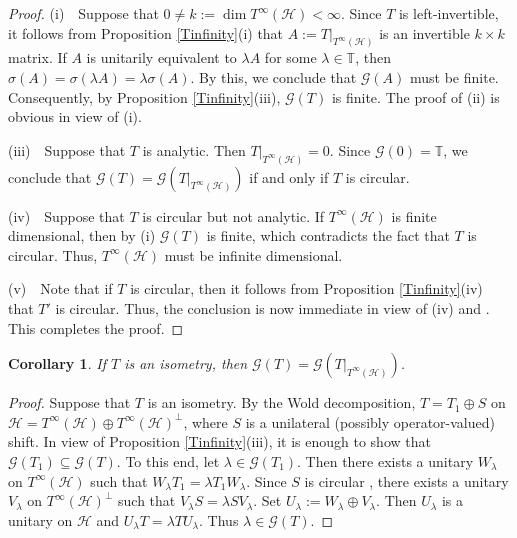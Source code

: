 \documentclass[10pt,a4paper]{amsart}
\newtheorem{corollary}[theorem]{Corollary}%
\begin{document}
\begin{proof}
(i)\ \ Suppose that $0 \ne k := \dim T^\infty(\mathcal H) < \infty$. Since $T$ is left-invertible, it follows from Proposition \ref{Tinfinity}(i) that $A := T|_{T^\infty(\mathcal H)}$ is an invertible $k \times k$ matrix. If $A$ is unitarily equivalent to $\lambda A$ for some $\lambda \in \mathbb T$, then $\sigma(A) = \sigma(\lambda A) = \lambda \sigma(A)$. By this, we conclude that $\mathcal G(A)$ must be finite. Consequently, by Proposition \ref{Tinfinity}(iii), $\mathcal G(T)$ is finite. The proof of (ii) is obvious in view of (i).

(iii)\ \ Suppose that $T$ is analytic. Then $T|_{T^\infty(\mathcal H)} = 0$. Since $\mathcal G(0) = \mathbb T$, we conclude that $\mathcal G(T) = \mathcal G(T|_{T^\infty(\mathcal H)})$ if and only if $T$ is circular.

(iv)\ \ Suppose that $T$ is circular but not analytic. If $T^\infty(\mathcal H)$ is finite dimensional, then by (i) $\mathcal G(T)$ is finite, which contradicts the fact that $T$ is circular. Thus, $T^\infty(\mathcal H)$ must be infinite dimensional. 

(v)\ \ Note that if $T$ is circular, then it follows from Proposition \ref{Tinfinity}(iv) that $T'$ is circular. Thus, the conclusion is now immediate in view of (iv) and \cite[Proposition 2.7]{S}. This completes the proof.
\end{proof}

\begin{corollary}
If $T$ is an isometry, then $\mathcal G(T) = \mathcal G(T|_{T^\infty(\mathcal H)})$.
\end{corollary}

\begin{proof}
Suppose that $T$ is an isometry. By the Wold decomposition, $T = T_1 \oplus S$ on $\mathcal H = T^\infty(\mathcal H) \oplus T^\infty(\mathcal H)^\bot$, where $S$ is a unilateral (possibly operator-valued) shift. In view of Proposition \ref{Tinfinity}(iii), it is enough to show that $\mathcal G(T_1) \subseteq \mathcal G(T)$. To this end, let $\lambda \in \mathcal G(T_1)$. Then there exists a unitary $W_\lambda$ on $T^\infty(\mathcal H)$ such that $W_\lambda T_1 = \lambda T_1 W_\lambda$. Since $S$ is circular \cite[Proposition 4.1]{GKT}, there exists a unitary $V_\lambda$ on $T^\infty(\mathcal H)^\bot$ such that $V_\lambda S = \lambda S V_\lambda$. Set $U_\lambda := W_\lambda \oplus V_\lambda$. Then $U_\lambda$ is a unitary on $\mathcal H$ and $U_\lambda T = \lambda T U_\lambda$. Thus $\lambda \in \mathcal G(T)$. 
\end{proof}
\end{document}
